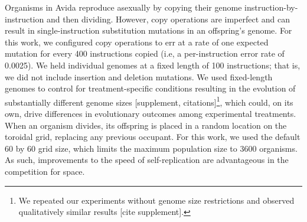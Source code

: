 Organisms in Avida reproduce asexually by copying their genome instruction-by-instruction and then dividing. 
However, copy operations are imperfect and can result in single-instruction substitution mutations in an offspring's genome. 
For this work, we configured copy operations to err at a rate of one expected mutation for every 400 instructions copied (i.e, a per-instruction error rate of 0.0025).
We held individual genomes at a fixed length of 100 instructions; that is, we did not include insertion and deletion mutations. 
We used fixed-length genomes to control for treatment-specific conditions resulting in the evolution of substantially different genome sizes [supplement, citations]\footnote{We repeated our experiments without genome size restrictions and observed qualitatively similar results [cite supplement].}, which could, on its own, drive differences in evolutionary outcomes among experimental treatments.
When an organism divides, its offspring is placed in a random location on the toroidal grid, replacing any previous occupant.
For this work, we used the default 60 by 60 grid size, which limits the maximum population size to 3600 organisms.
As such, improvements to the speed of self-replication are advantageous in the competition for space.




